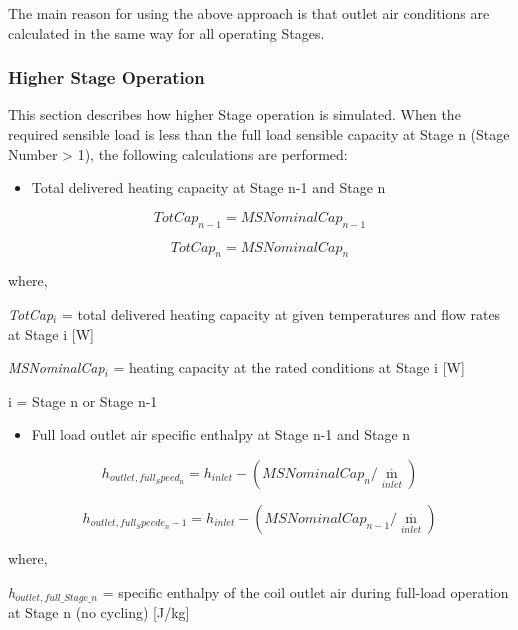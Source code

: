 The main reason for using the above approach is that outlet air conditions are calculated in the same way for all operating Stages.

\subsubsection{Higher Stage Operation}\label{higher-stage-operation}

This section describes how higher Stage operation is simulated. When the required sensible load is less than the full load sensible capacity at Stage n (Stage Number \textgreater{} 1), the following calculations are performed:

\begin{itemize}
  \item Total delivered heating capacity at Stage n-1 and Stage n
\end{itemize}

\begin{equation}
TotCa{p_{n - 1}} = MSNominalCa{p_{n - 1}}
\end{equation}

\begin{equation}
TotCa{p_n} = MSNominalCa{p_n}
\end{equation}

where,

\emph{TotCap\(_{i}\)} = total delivered heating capacity at given temperatures and flow rates at Stage i {[}W{]}

\emph{MSNominalCap\(_{i}\)} = heating capacity at the rated conditions at Stage i {[}W{]}

i = Stage n or Stage n-1

\begin{itemize}
  \item Full load outlet air specific enthalpy at Stage n-1 and Stage n
\end{itemize}

\begin{equation}
{h_{outlet,full_Speed_n}} = {h_{inlet}} - (MSNominalCa{p_n}/{\mathop m\limits^._{inlet}})
\end{equation}

\begin{equation}
{h_{outlet,full_Speede_n - 1}} = {h_{inlet}} - (MSNominalCa{p_{n - 1}}/{\mathop m\limits^._{inlet}})
\end{equation}

where,

\emph{h\(_{outlet,full\_Stage\_n}\)} = specific enthalpy of the coil outlet air during full-load operation at Stage n (no cycling) {[}J/kg{]}

